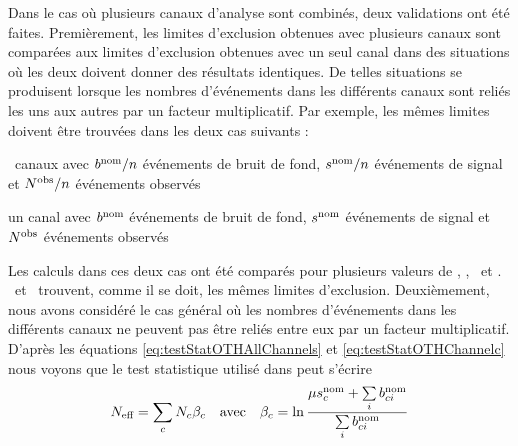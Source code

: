 Dans le cas o\`u plusieurs canaux d'analyse sont combin\'es, deux validations ont \'et\'e faites. Premi\`erement, les limites d'exclusion obtenues avec plusieurs canaux sont compar\'ees aux limites d'exclusion obtenues avec un seul canal dans des situations o\`u les deux doivent donner des r\'esultats identiques. De telles situations se produisent lorsque les nombres d'\'ev\'enements dans les diff\'erents canaux sont reli\'es les uns aux autres par un facteur multiplicatif. Par exemple, les m\^emes limites doivent \^etre trouv\'ees dans les deux cas suivants :
\begin{maliste}
\item \nochan~canaux avec $b^{\text{nom}}/n$ \'ev\'enements de bruit de fond, $s^{\text{nom}}/n$ \'ev\'enements de signal et $N^{\text{obs}}/n$ \'ev\'enements observ\'es
\item un canal avec $b^{\text{nom}}$ \'ev\'enements de bruit de fond, $s^{\text{nom}}$ \'ev\'enements de signal et $N^{\text{obs}}$ \'ev\'enements observ\'es

\end{maliste}

Les calculs dans ces deux cas ont \'et\'e compar\'es pour plusieurs valeurs de \snom, \bnom, \nobs~et \nochan. \opthylic~et \tifosi~trouvent, comme il se doit, les m\^emes limites d'exclusion. Deuxi\`emement, nous avons consid\'er\'e le cas g\'en\'eral o\`u les nombres d'\'ev\'enements dans les diff\'erents canaux ne peuvent pas \^etre reli\'es entre eux par un facteur multiplicatif. D'apr\`es les \'equations \ref{eq:testStatOTHAllChannels} et \ref{eq:testStatOTHChannelc} nous voyons que le test statistique utilis\'e dans \opthylic{} peut s'\'ecrire
\[N_{\text{eff}}=\sum\limits_c N_{c}\beta_c\quad\text{avec}\quad\beta_c=\ln\frac{\mu s_c^{\text{nom}}+\sum\limits_ib_{ci}^{\text{nom}}}{\sum\limits_ib_{ci}^{\text{nom}}}\] 

